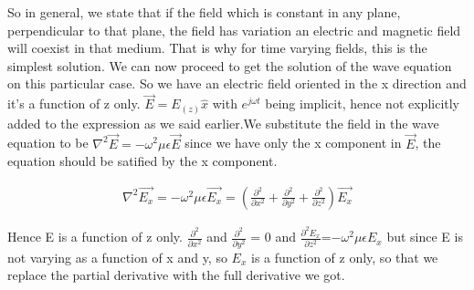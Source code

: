 So in general, we state that if the field which is constant in any plane, perpendicular to that plane, the field has variation an electric and magnetic field will coexist in that medium. That is why for time varying fields, this is the simplest solution. We can now proceed to get the solution of the wave equation on this particular case. So we have an electric field oriented in the x direction and it's a function of z only. $\vec{E}=E_(z)\hat{x}$ with $e^{j\omega t}$ being implicit, hence not explicitly added to the expression as we said earlier.We substitute the field in the wave equation to be $\nabla^2\vec{E}=-\omega^2\mu\epsilon\vec{E}$ since we have only the x component in $\vec{E}$, the equation should be satified by the x component.

\begin{align}
\nabla^2\vec{E_{x}}=-\omega^2\mu\epsilon\vec{E_{x}} =( {\frac{\partial^2}{\partial x^2} + \frac{\partial^2}{\partial y^2} + \frac{\partial^2}{\partial z^2}})\vec{E_{x}}
\end{align}

Hence E is a function of z only.
$\frac{\partial^2}{\partial x^2}$ and $\frac{\partial^2}{\partial y^2}$ = 0 and $\frac{\partial^2  E_x}{\partial z^2}$=$-\omega^2\mu\epsilon E_{x}$ but since E is not varying as a function of x and y, so $E_x$ is a function of z only, so that we replace the partial derivative with the full derivative we got.

